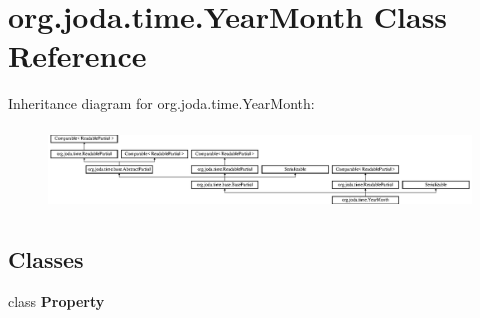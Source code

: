 \hypertarget{classorg_1_1joda_1_1time_1_1_year_month}{\section{org.\-joda.\-time.\-Year\-Month Class Reference}
\label{classorg_1_1joda_1_1time_1_1_year_month}
}
Inheritance diagram for org.\-joda.\-time.\-Year\-Month\-:\begin{figure}[H]
\begin{center}
\leavevmode
\includegraphics[height=2.211690cm]{classorg_1_1joda_1_1time_1_1_year_month}
\end{center}
\end{figure}
\subsection*{Classes}
\begin{DoxyCompactItemize}
\item 
class {\bfseries Property}
\end{DoxyCompactItemize}

